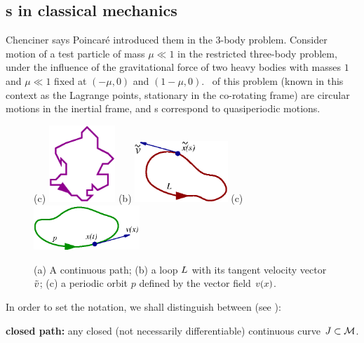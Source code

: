 \subsection{{\Rpo s} in classical mechanics}

Chenciner
says Poincar\'e introduced them in the 3-body problem.
Consider motion of a test particle of mass
$\mu \ll 1$ in the
restricted three-body problem,
under the
influence of the gravitational force of two heavy bodies with masses $1$ and
$\mu \ll 1$ fixed at $(-\mu,0)$ and $(1-\mu,0)$. \Reqv\ of this problem
(known in this context as the Lagrange points, stationary in
the co-rotating frame) are circular motions in the inertial frame,
and {\rpo s} correspond to quasiperiodic motions. 

\begin{figure}[t] %
\centering
(c) \includegraphics[width=2.5cm]{figs/path.eps}
\hspace{0.1in}
(b) \includegraphics[width=3.5cm]{figs/loop.eps}
\hspace{0.1in}
(c) \includegraphics[width=4.0cm]{figs/porbit.eps}
\caption{
 (a) A continuous path; (b) a loop $L$ with its tangent velocity vector $\tilde{v}$;
 (c) a periodic orbit $p$ defined by the vector field $v(x)$.
        }
\label{f:loops}
\end{figure}

    In order to set the notation, we shall distinguish between (see ):

\medskip
\noindent
 {\bf closed path:}
 any closed (not necessarily differentiable) continuous curve 
$J \subset {\cal M}$.

